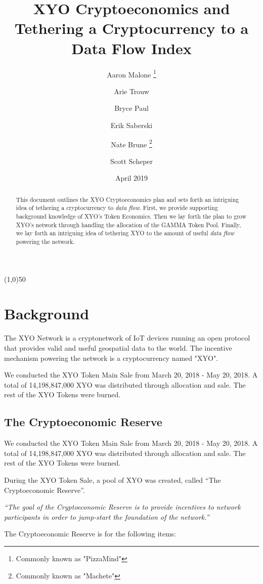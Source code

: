 \documentclass{article}
\title {XYO Cryptoeconomics and Tethering a Cryptocurrency to a Data Flow Index}
\author{
    Aaron Malone \thanks{Commonly known as "PizzaMind"}\\
    \and
    Arie Trouw\\
    \and    
    Bryce Paul\\
    \and
    Erik Saberski\\
    \and
    Nate Brune \thanks{Commonly known as "Machete"}\\
    \and
    Scott Scheper\\
}
\date{April 2019}
\begin{document}
\pagecolor{limegreen}

\maketitle

\begin{center}
\line(1,0){50}
\end{center}

\begin{abstract}
This document outlines the XYO Cryptoeconomics plan and sets forth an intriguing idea of tethering a cryptocurrency to \textit{data flow}. First, we provide supporting background knowledge of XYO's Token Economics. Then we lay forth the plan to grow XYO's network through handling the allocation of the GAMMA Token Pool. Finally, we lay forth an intriguing idea of tethering XYO to the amount of useful \textit{data flow} powering the network.
\end{abstract}

\section{Background}
The XYO Network is a cryptonetwork of IoT devices running an open protocol that provides valid and useful geospatial data to the world. The incentive mechanism powering the network is a cryptocurrency named "XYO".

We conducted the XYO Token Main Sale from March 20, 2018 - May 20, 2018. A total of 14,198,847,000 XYO was distributed through allocation and sale. The rest of the XYO Tokens were burned.

\subsection{The Cryptoeconomic Reserve}
We conducted the XYO Token Main Sale from March 20, 2018 - May 20, 2018. A total of 14,198,847,000 XYO was distributed through allocation and sale. The rest of the XYO Tokens were burned.

During the XYO Token Sale, a pool of XYO was created, called “The Cryptoeconomic Reserve”.

\begin{displayquote}\textit{``The goal of the Cryptoeconomic Reserve is to provide incentives to network participants in order to jump-start the foundation of the network.''} \cite{crypto-reserve}
\end{displayquote}

The Cryptoeconomic Reserve is for the following items:
\end{document}
